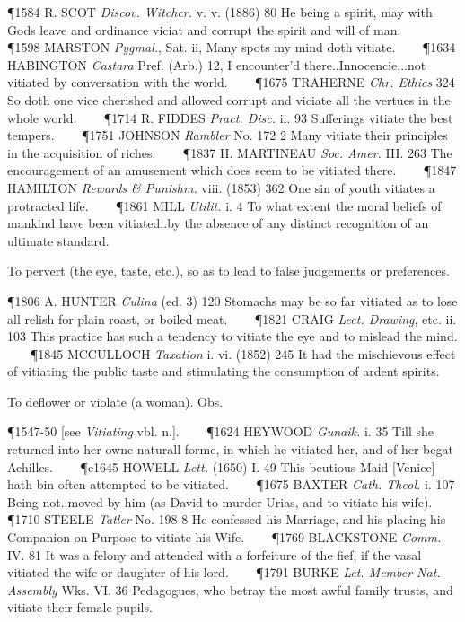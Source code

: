 \begin{description}[wide, labelwidth=!, labelindent=0pt]
\begin{myenumerate}
\P 1584 R. SCOT  \textit{Discov. Witchcr.} v. v. (1886) 80 He being a spirit, may with Gods leave and ordinance viciat and corrupt the spirit and will of man.    
\P 1598 MARSTON  \textit{Pygmal.}, Sat. ii, Many spots my mind doth vitiate.    
\P 1634 HABINGTON  \textit{Castara} Pref. (Arb.) 12, I encounter'd there..Innocencie,..not vitiated by conversation with the world.    
\P 1675 TRAHERNE  \textit{Chr. Ethics} 324 So doth one vice cherished and allowed corrupt and viciate all the vertues in the whole world.    
\P 1714 R. FIDDES  \textit{Pract. Disc.} ii. 93 Sufferings vitiate the best tempers.    
\P 1751 JOHNSON  \textit{Rambler} No. 172 2 Many vitiate their principles in the acquisition of riches.    
\P 1837 H. MARTINEAU  \textit{Soc. Amer.} III. 263 The encouragement of an amusement which does seem to be vitiated there.    
\P 1847 HAMILTON  \textit{Rewards \& Punishm.} viii. (1853) 362 One sin of youth vitiates a protracted life.    
\P 1861 MILL  \textit{Utilit.} i. 4 To what extent the moral beliefs of mankind have been vitiated..by the absence of any distinct recognition of an ultimate standard.

 To pervert (the eye, taste, etc.), so as to lead to false judgements or preferences.

\P 1806 A. HUNTER  \textit{Culina} (ed. 3) 120 Stomachs may be so far vitiated as to lose all relish for plain roast, or boiled meat.    
\P 1821 CRAIG  \textit{Lect. Drawing}, etc. ii. 103 This practice has such a tendency to vitiate the eye and to mislead the mind.    
\P 1845 MCCULLOCH  \textit{Taxation} i. vi. (1852) 245 It had the mischievous effect of vitiating the public taste and stimulating the consumption of ardent spirits.

 To deflower or violate (a woman). Obs.

\P 1547-50 [see \textit{Vitiating} vbl. n.].    
\P 1624 HEYWOOD  \textit{Gunaik.} i. 35 Till she returned into her owne naturall forme, in which he vitiated her, and of her begat Achilles.    
\P c1645 HOWELL  \textit{Lett.} (1650) I. 49 This beutious Maid [Venice] hath bin often attempted to be vitiated.    
\P 1675 BAXTER  \textit{Cath. Theol.} i. 107 Being not..moved by him (as David to murder Urias, and to vitiate his wife).    
\P 1710 STEELE  \textit{Tatler} No. 198 8 He confessed his Marriage, and his placing his Companion on Purpose to vitiate his Wife.    
\P 1769 BLACKSTONE  \textit{Comm.} IV. 81 It was a felony and attended with a forfeiture of the fief, if the vasal vitiated the wife or daughter of his lord.    
\P 1791 BURKE  \textit{Let. Member Nat. Assembly} Wks. VI. 36 Pedagogues, who betray the most awful family trusts, and vitiate their female pupils.


\end{myenumerate}
\end{description}
